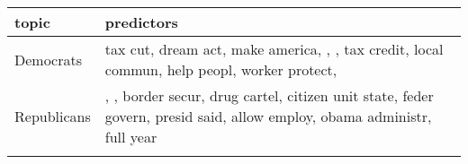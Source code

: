 \begingroup\tiny
\begin{longtable}{p{}p{}}
  \hline
topic & predictors \\ 
  \hline
Democrats & tax cut, dream act, make america, {\color{red}{american job act}}, {\color{red}{middl class}}, tax credit, local commun,  help peopl, worker protect, {\color{red}{unemploy insur}}  \\ 
   \hline
Republicans & {\color{red}{illeg alien}}, {\color{red}{job creat}}, border secur, drug cartel, citizen unit state, feder govern,  presid said, allow employ, obama administr, full year \\ 
 \hline
\label{tab:top20_major}
\end{longtable}
\endgroup
  